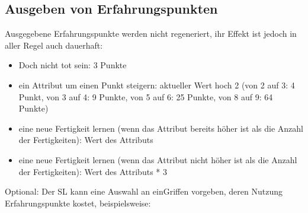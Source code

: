  

\subsection{Ausgeben von Erfahrungspunkten}

Ausgegebene Erfahrungspunkte werden nicht regeneriert, ihr Effekt ist jedoch in aller Regel auch dauerhaft:
\begin{itemize}
\item Doch nicht tot sein: 3 Punkte
\item ein Attribut um einen Punkt steigern: aktueller Wert hoch 2 (von 2 auf 3: 4 Punkt, von 3 auf 4: 9 Punkte, von 5 auf 6: 25 Punkte, von 8 auf 9: 64 Punkte)
\item eine neue Fertigkeit lernen (wenn das Attribut bereits höher ist als die Anzahl der Fertigkeiten): Wert des Attributs
\item eine neue Fertigkeit lernen (wenn das Attribut nicht höher ist als die Anzahl der Fertigkeiten): Wert des Attributs * 3
\end{itemize}
 

Optional: Der SL kann eine Auswahl an einGriffen vorgeben, deren Nutzung Erfahrungspunkte kostet, beispielsweise:

 
